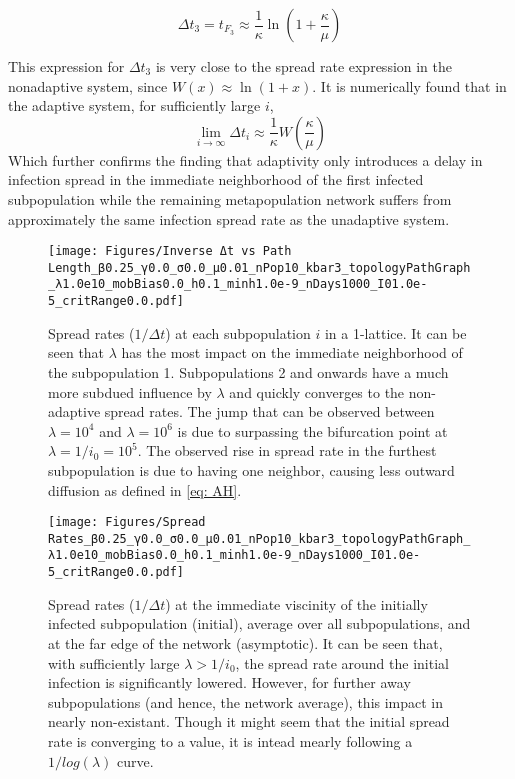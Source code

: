\begin{equation}\Delta t_3 = t_{F_3} \approx \frac{1}{\kappa} \ln(1+\frac{ \kappa}{\mu})\end{equation}

This expression for $\Delta t_3$ is very close to the spread rate expression in the nonadaptive system, since $W(x) \approx \ln(1+x)$. It is numerically found that in the adaptive system, for sufficiently large $i$, 
\[
\lim_{i \to \infty} \Delta t_i \approx \frac{1}{\kappa} W\left(\frac{\kappa}{\mu}\right)
\]
Which further confirms the finding that adaptivity only introduces a delay in infection spread in the immediate neighborhood of the first infected subpopulation while the remaining metapopulation network suffers from approximately the same infection spread rate as the unadaptive system. 


\begin{figure}
    \centering
    \texttt{[image: Figures/Inverse Δt vs Path Length\_β0.25\_γ0.0\_σ0.0\_μ0.01\_nPop10\_kbar3\_topologyPathGraph\_λ1.0e10\_mobBias0.0\_h0.1\_minh1.0e-9\_nDays1000\_I01.0e-5\_critRange0.0.pdf]}
    \caption{\small Spread rates ($1/\Delta t$) at each subpopulation $i$ in a 1-lattice. It can be seen that $\lambda$ has the most impact on the immediate neighborhood of the subpopulation 1. Subpopulations 2 and onwards have a much more subdued influence by $\lambda$ and quickly converges to the non-adaptive spread rates. The jump that can be observed between $\lambda=10^4$ and $\lambda=10^6$ is due to surpassing the bifurcation point at $\lambda=1/i_0=10^5$. The observed rise in spread rate in the furthest subpopulation is due to having one neighbor, causing less outward diffusion as defined in \ref{eq: AH}.}
    \label{fig: inverse Δt vs path length var lambda}
\end{figure}

\begin{figure}
    \centering
    \texttt{[image: Figures/Spread Rates\_β0.25\_γ0.0\_σ0.0\_μ0.01\_nPop10\_kbar3\_topologyPathGraph\_λ1.0e10\_mobBias0.0\_h0.1\_minh1.0e-9\_nDays1000\_I01.0e-5\_critRange0.0.pdf]}
    \caption{\small Spread rates ($1/{\Delta t}$) at the immediate viscinity of the initially infected subpopulation (initial), average over all subpopulations, and at the far edge of the network (asymptotic). It can be seen that, with sufficiently large $\lambda >1/i_0$, the spread rate around the initial infection is significantly lowered. However, for further away subpopulations (and hence, the network average), this impact in nearly non-existant. Though it might seem that the initial spread rate is converging to a value, it is intead mearly following a $1/log(\lambda)$ curve.}
    \label{fig: Spread rates vs λ}
\end{figure}


